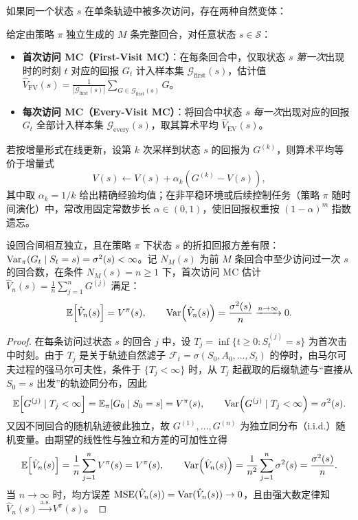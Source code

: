 如果同一个状态 $s$ 在单条轨迹中被多次访问，存在两种自然变体：
\begin{defBox}
\begin{definition}[首次访问与每次访问 MC 评估]
给定由策略 $\pi$ 独立生成的 $M$ 条完整回合，对任意状态 $s \in \mathcal{S}$：
\begin{itemize}
  \item \textbf{首次访问 MC（First-Visit MC）}：在每条回合中，仅取状态 $s$ \emph{第一次}出现时的时刻 $t$ 对应的回报 $G_t$ 计入样本集 $\mathcal{G}_{\mathrm{first}}(s)$，估计值 $\hat{V}_{\mathrm{FV}}(s) = \frac{1}{|\mathcal{G}_{\mathrm{first}}(s)|}\sum_{G \in \mathcal{G}_{\mathrm{first}}(s)} G$。
  \item \textbf{每次访问 MC（Every-Visit MC）}：将回合中状态 $s$ \emph{每一次}出现对应的回报 $G_t$ 全部计入样本集 $\mathcal{G}_{\mathrm{every}}(s)$，取其算术平均 $\hat{V}_{\mathrm{EV}}(s)$。
\end{itemize}
若按增量形式在线更新，设第 $k$ 次采样到状态 $s$ 的回报为 $G^{(k)}$，则算术平均等价于增量式
\begin{equation}
  V(s) \leftarrow V(s) + \alpha_k \!\left(G^{(k)} - V(s)\right),
  \label{eq:mc-inc}
\end{equation}
其中取 $\alpha_k = 1/k$ 给出精确经验均值；在非平稳环境或后续控制任务（策略 $\pi$ 随时间演化）中，常改用固定常数步长 $\alpha \in (0, 1)$，使旧回报权重按 $(1-\alpha)^m$ 指数遗忘。
\end{definition}
\end{defBox}

\begin{thmBox}
\begin{theorem}
\label{thm:mc-unbiased}
设回合间相互独立，且在策略 $\pi$ 下状态 $s$ 的折扣回报方差有限：$\operatorname{Var}_\pi(G_t \mid S_t = s) = \sigma^2(s) < \infty$。记 $N_M(s)$ 为前 $M$ 条回合中至少访问过一次 $s$ 的回合数，在条件 $N_M(s) = n \ge 1$ 下，首次访问 MC 估计 $\hat{V}_n(s) = \frac{1}{n}\sum_{j=1}^n G^{(j)}$ 满足：
\[
  \mathbb{E}\!\left[\hat{V}_n(s)\right] = V^\pi(s), \qquad
  \operatorname{Var}\!\left(\hat{V}_n(s)\right) = \frac{\sigma^2(s)}{n} \xrightarrow{n \to \infty} 0.
\]
\end{theorem}
\begin{proof}
在每条访问过状态 $s$ 的回合 $j$ 中，设 $T_j = \inf\{t \ge 0 : S_t^{(j)} = s\}$ 为首次击中时刻。由于 $T_j$ 是关于轨迹自然滤子 $\mathcal{F}_t = \sigma(S_0, A_0, \dots, S_t)$ 的停时，由马尔可夫过程的强马尔可夫性，条件于 $\{T_j < \infty\}$ 时，从 $T_j$ 起截取的后缀轨迹与“直接从 $S_0 = s$ 出发”的轨迹同分布，因此
\[
  \mathbb{E}\!\left[G^{(j)} \mid T_j < \infty\right] = \mathbb{E}_\pi\!\left[G_0 \mid S_0 = s\right] = V^\pi(s), \qquad
  \operatorname{Var}\!\left(G^{(j)} \mid T_j < \infty\right) = \sigma^2(s).
\]
又因不同回合的随机轨迹彼此独立，故 $G^{(1)}, \dots, G^{(n)}$ 为独立同分布（i.i.d.）随机变量。由期望的线性性与独立和方差的可加性立得
\[
  \mathbb{E}\!\left[\hat{V}_n(s)\right] = \frac{1}{n}\sum_{j=1}^n V^\pi(s) = V^\pi(s), \qquad
  \operatorname{Var}\!\left(\hat{V}_n(s)\right) = \frac{1}{n^2}\sum_{j=1}^n \sigma^2(s) = \frac{\sigma^2(s)}{n}.
\]
当 $n \to \infty$ 时，均方误差 $\mathrm{MSE}(\hat{V}_n(s)) = \operatorname{Var}(\hat{V}_n(s)) \to 0$，且由强大数定律知 $\hat{V}_n(s) \xrightarrow{\text{a.s.}} V^\pi(s)$。
\end{proof}
\end{thmBox}

